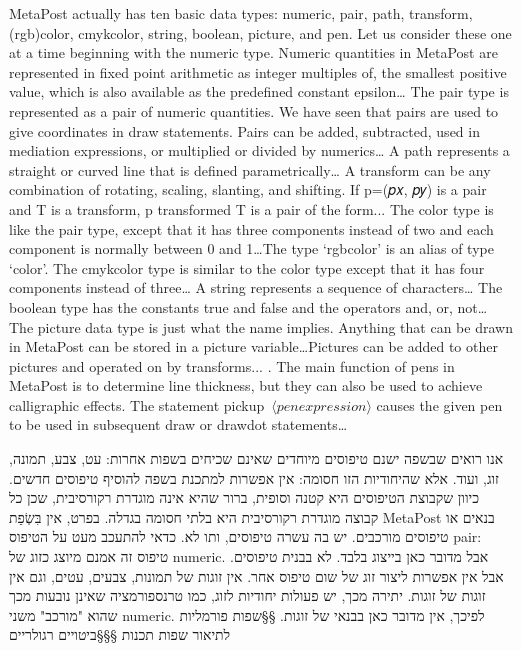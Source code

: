 MetaPost actually has ten basic data types: numeric, pair, path, transform, (rgb)color, cmykcolor, string, boolean, picture, and pen. Let us consider these one at a time beginning with the numeric type.
Numeric quantities in MetaPost are represented in fixed point arithmetic as integer multiples of, the smallest positive value, which is also available as the predefined constant epsilon…
The pair type is represented as a pair of numeric quantities. We have seen that pairs are used to give coordinates in draw statements. Pairs can be added, subtracted, used in mediation expressions, or multiplied or divided by numerics…
A path represents a straight or curved line that is defined parametrically…
A transform can be any combination of rotating, scaling, slanting, and shifting. If p=(𝑝𝑥, 𝑝𝑦) is a pair and T is a transform,
p transformed T
is a pair of the form...
The color type is like the pair type, except that it has three components instead of two and each component is normally between 0 and 1…The type ‘rgbcolor’ is an alias of type ‘color’.
The cmykcolor type is similar to the color type except that it has four components instead of three…
A string represents a sequence of characters…
The boolean type has the constants true and false and the operators and, or, not…
The picture data type is just what the name implies. Anything that can be drawn in MetaPost can be stored in a picture variable…Pictures can be added to other pictures and operated on by transforms...
. The main function of pens in MetaPost is to determine line thickness, but they can also be used to achieve calligraphic effects. The statement pickup~$⟨{pen expression}⟩$ causes the given pen to be used in subsequent draw or drawdot statements…

אנו רואים שבשפה ישנם טיפוסים מיוחדים שאינם שכיחים בשפות אחרות: עט, צבע,
תמונה, זוג, ועוד. אלא שהיחודיות הזו חסומה: אין אפשרות למתכנת בשפה להוסיף
טיפוסים חדשים. כיוון שקבוצת הטיפוסים היא קטנה וסופית, ברור שהיא אינה
מוגדרת רקורסיבית, שכן כל קבוצה מוגדרת רקורסיבית היא בלתי חסומה בגדלה.
בפרט, אין בִּשְׂפַת MetaPost בנאים או טיפוסים מורכבים. יש בה עשרה טיפוסים, ותו
לא. כדאי להתעכב מעט על הטיפוס pair: טיפוס זה אמנם מיוצג כזוג של numeric.
אבל מדובר כאן בייצוג בלבד. לא בבנית טיפוסים. אבל אין אפשרות ליצור זוג של
שום טיפוס אחר. אין זוגות של תמונות, צבעים, עטים, וגם אין זוגות של זוגות.
יתירה מכך, יש פעולות יחודיות לזוג, כמו טרנספורמציה שאינן נובעות מכך שהוא
"מורכב" משני numeric. לפיכך, אין מדובר כאן בבנאי של זוגות.
§§שפות פורמליות לתיאור שפות תכנות
§§§ביטויים רגולריים

